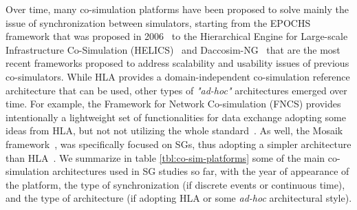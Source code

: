 \documentclass[1p]{elsarticle} %
\begin{document}





Over time, many co-simulation platforms have been proposed to solve mainly the issue of synchronization between simulators, starting from the EPOCHS framework that was proposed in 2006~\citep{ref:hopkinson2006epochs} to the Hierarchical Engine for Large-scale Infrastructure Co-Simulation (HELICS)~\citep{ref:palmintier2017design} and Daccosim-NG~\citep{ref:evora2019daccosim} that are the most recent frameworks proposed to address scalability and usability issues of previous co-simulators. While HLA provides a domain-independent co-simulation reference architecture that can be used, other types of \textit{"ad-hoc"} architectures  emerged over time. For example, the Framework for Network Co-simulation (FNCS) provides intentionally a lightweight set of functionalities for data exchange adopting some ideas from HLA, but not not utilizing the whole standard~\citep{ref:ciraci2014fncs}. As well, the Mosaik framework~\cite{HLAarch2}, was specifically focused on SGs, thus adopting a simpler architecture than HLA~\cite{104-Steinbrink2018-Smartgridco}.
We summarize in table \ref{tbl:co-sim-platforms} some of the main co-simulation architectures used in SG studies so far, with the year of appearance of the platform, the type of synchronization (if discrete events or continuous time), and the type of architecture (if adopting HLA or some \textit{ad-hoc} architectural style).
\end{document}
